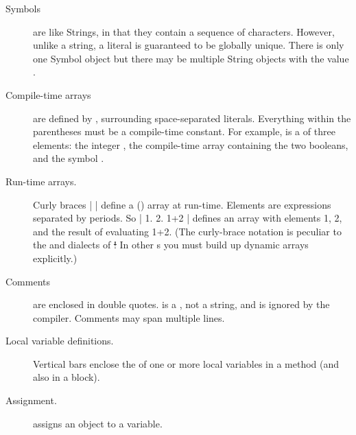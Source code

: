 \documentclass[a4paper,10pt,twoside]{book}
\begin{document}
\begin{description}
\item[Symbols] are like Strings, in that they contain a sequence of characters.  
	However, unlike a string, a literal  is guaranteed to be globally unique.
		There is only one Symbol object  but there may be multiple String objects with the value .

\item[Compile-time arrays] are defined by \ct{#( )}, surrounding space-separated literals.
		Everything within the parentheses must be a compile-time constant.
		For example,   is a   of three elements: the integer , the compile-time array containing the two booleans, and the symbol .

\item[Run-time arrays.] Curly braces \ct|{ }| define a () array at run-time.
		Elements are expressions separated by periods.
		So \ct|{ 1. 2. 1+2 }| defines an array with elements 1, 2, and the result of evaluating 1+2.
		(The curly-brace notation is peculiar to the \pharo and \squeak dialects of \st!
		In other \st{}s you must build up dynamic arrays explicitly.)

\item[Comments] are enclosed in double quotes.
		 is a , not a string, and is ignored by the \pharo compiler.
		Comments may span multiple lines.
		
\item[Local variable definitions.]	Vertical bars \ct{| |} enclose the  of one or more local variables in a method (and also in a block).

\item[Assignment.]	\ct{:=} assigns an object to a variable.


\end{description}
\end{document}
